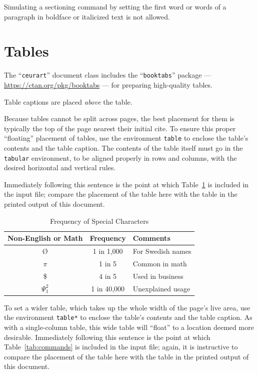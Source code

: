 \documentclass[
]{ceurart}
\begin{document}
Simulating a sectioning command by setting the first word or words of
a paragraph in boldface or italicized text is not allowed.

\section{Tables}

The ``\verb|ceurart|'' document class includes the ``\verb|booktabs|''
package --- \url{https://ctan.org/pkg/booktabs} --- for preparing
high-quality tables.

Table captions are placed \textit{above} the table.

Because tables cannot be split across pages, the best placement for
them is typically the top of the page nearest their initial cite.  To
ensure this proper ``floating'' placement of tables, use the
environment \verb|table| to enclose the table's contents and the
table caption. The contents of the table itself must go in the
\verb|tabular| environment, to be aligned properly in rows and
columns, with the desired horizontal and vertical rules.

Immediately following this sentence is the point at which
Table~\ref{tab:freq} is included in the input file; compare the
placement of the table here with the table in the printed output of
this document.

\begin{table}
  \caption{Frequency of Special Characters}
  \label{tab:freq}
  \begin{tabular}{ccl}
    \toprule
    Non-English or Math&Frequency&Comments\\
    \midrule
    \O & 1 in 1,000& For Swedish names\\
    $\pi$ & 1 in 5& Common in math\\
    \$ & 4 in 5 & Used in business\\
    $\Psi^2_1$ & 1 in 40,000& Unexplained usage\\
  \bottomrule
\end{tabular}
\end{table}

To set a wider table, which takes up the whole width of the page's
live area, use the environment \verb|table*| to enclose the table's
contents and the table caption.  As with a single-column table, this
wide table will ``float'' to a location deemed more
desirable. Immediately following this sentence is the point at which
Table~\ref{tab:commands} is included in the input file; again, it is
instructive to compare the placement of the table here with the table
in the printed output of this document.
\end{document}
